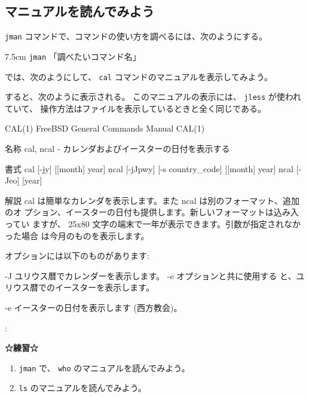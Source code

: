 \subsection{マニュアルを読んでみよう}

 \texttt{jman} コマンドで、コマンドの使い方を調べるには、次のようにする。

\begin{coml}{7.5cm}
\texttt{jman} 「調べたいコマンド名」
\end{coml}

では、次のようにして、 \texttt{cal} コマンドのマニュアルを表示してみよう。

\begin{progls}
\end{progls}

すると、次のように表示される。
このマニュアルの表示には、 \texttt{jless} が使われていて、
操作方法はファイルを表示しているときと全く同じである。

\begin{progls}
CAL(1)                  FreeBSD General Commands Manual                 CAL(1)

名称
     cal, ncal - カレンダおよびイースターの日付を表示する

書式
     cal [-jy] [[month] year]
     ncal [-jJpwy] [-s country_code] [[month] year]
     ncal [-Jeo] [year]

解説
     cal は簡単なカレンダを表示します。また ncal は別のフォーマット、追加のオ
     プション、イースターの日付も提供します。新しいフォーマットは込み入ってい
     ますが、 25x80 文字の端末で一年が表示できます。引数が指定されなかった場合
     は今月のものを表示します。

     オプションには以下のものがあります:

     -J      ユリウス暦でカレンダーを表示します。 -e オプションと共に使用する
             と、ユリウス暦でのイースターを表示します。

     -e      イースターの日付を表示します (西方教会)。

:\blsq
\end{progls}

\begin{BOXNOTE}
\textbf{\large ☆練習☆}
\begin{enumerate}
\item \texttt{jman} で、 \texttt{who} のマニュアルを読んでみよう。
\item \texttt{ls} のマニュアルを読んでみよう。
\end{enumerate}
\end{BOXNOTE}


